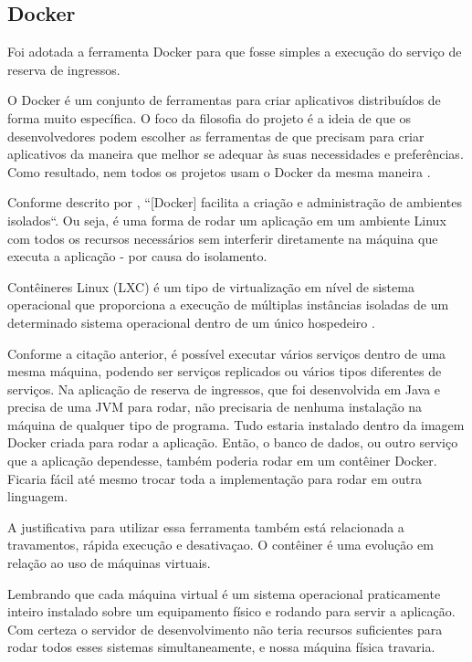 \subsection{Docker}\label{docker}

Foi adotada a ferramenta Docker para que fosse simples a execução do serviço de reserva de ingressos.

\begin{citacao}
O Docker é um conjunto de ferramentas para criar aplicativos distribuídos de forma muito específica.
O foco da filosofia do projeto é a ideia de que os desenvolvedores podem escolher as ferramentas
de que precisam para criar aplicativos da maneira que melhor se adequar às suas necessidades e preferências.
Como resultado, nem todos os projetos usam o Docker da mesma maneira \cite{solomon-hykes}.
\end{citacao}

Conforme descrito por , ``[Docker] facilita a criação e administração de ambientes isolados``.
Ou seja, é uma forma de rodar um aplicação em um ambiente Linux com todos os recursos necessários sem interferir
diretamente na máquina que executa a aplicação - por causa do isolamento.

\begin{citacao}
Contêineres Linux (LXC) é um tipo de
virtualização em nível de sistema operacional que proporciona a execução de múltiplas instâncias isoladas de um determinado
sistema operacional dentro de um único hospedeiro \cite{sinestec-01}.
\end{citacao}

Conforme a citação anterior, é possível executar vários serviços dentro de uma mesma máquina, podendo ser serviços
replicados ou vários tipos diferentes de serviços.
Na aplicação de reserva de ingressos, que foi desenvolvida em Java e precisa de uma JVM para rodar, não precisaria
de nenhuma instalação na máquina de qualquer tipo de programa.
Tudo estaria instalado dentro da imagem Docker criada para rodar a aplicação.
Então, o banco de dados, ou outro serviço que a aplicação dependesse, também poderia rodar em um contêiner Docker.
Ficaria fácil até mesmo trocar toda a implementação para rodar em outra linguagem.

A justificativa para utilizar essa ferramenta também está relacionada a travamentos, rápida execução e desativaçao.
O contêiner é uma evolução em relação ao uso de máquinas virtuais.

\begin{citacao}
Lembrando que cada máquina virtual é um sistema operacional praticamente inteiro instalado sobre um equipamento físico e
rodando para servir a aplicação. Com certeza o servidor de desenvolvimento não teria recursos suficientes para rodar
todos esses sistemas simultaneamente, e nossa máquina física travaria\cite{aprendendo-docker}.
\end{citacao}


